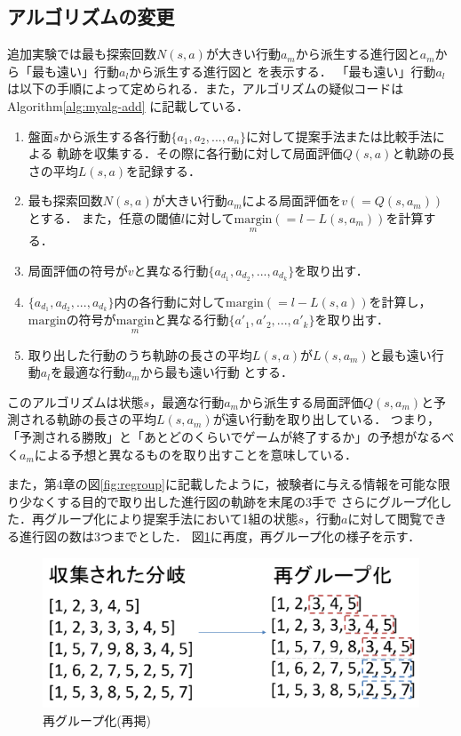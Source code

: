 \subsection{アルゴリズムの変更}
追加実験では最も探索回数$N(s, a)$が大きい行動$a_m$から派生する進行図と$a_m$から「最も遠い」行動$a_l$から派生する進行図と
を表示する．
「最も遠い」行動$a_l$は以下の手順によって定められる．また，アルゴリズムの疑似コードはAlgorithm\ref{alg:myalg-add} に記載している．
\begin{enumerate}
    \item 盤面$s$から派生する各行動$\{a_1, a_2, ..., a_n\}$に対して提案手法または比較手法による
    軌跡を収集する．その際に各行動に対して局面評価$Q(s, a)$と軌跡の長さの平均$L(s, a)$を記録する．
    \item 最も探索回数$N(s, a)$が大きい行動$a_m$による局面評価を$v(=Q(s, a_m))$とする．
    また，任意の閾値$l$に対して$\underset{m}{\textrm{margin}}(=l-L(s, a_m))$を計算する．
    \item 局面評価の符号が$v$と異なる行動$\{a_{d_1}, a_{d_2}, ..., a_{d_k}\}$を取り出す．
    \item $\{a_{d_1}, a_{d_2}, ..., a_{d_k}\}$内の各行動に対して$\textrm{margin}(=l-L(s, a))$を計算し，
    $\textrm{margin}$の符号が$\underset{m}{\textrm{margin}}$と異なる行動$\{{a'}_{1}, {a'}_{2}, ..., {a'}_{k}\}$を取り出す．
    \item 取り出した行動のうち軌跡の長さの平均$L(s, a)$が$L(s, a_m)$と最も遠い行動$a_l$を最適な行動$a_m$から最も遠い行動
    とする．
\end{enumerate}
このアルゴリズムは状態$s$，最適な行動$a_m$から派生する局面評価$Q(s, a_m)$と予測される軌跡の長さの平均$L(s, a_m)$が遠い行動を取り出している．
つまり，「予測される勝敗」と「あとどのくらいでゲームが終了するか」の予想がなるべく$a_m$による予想と異なるものを取り出すことを意味している．

また，第4章の図\ref{fig:regroup}に記載したように，被験者に与える情報を可能な限り少なくする目的で取り出した進行図の軌跡を末尾の3手で
さらにグループ化した．再グループ化により提案手法において1組の状態$s$，行動$a$に対して閲覧できる進行図の数は3つまでとした．
図\ref{fig:re-regroup}に再度，再グループ化の様子を示す．
\begin{figure}[htbp]
	\centering
	\includegraphics[width=\linewidth]{./figure/regroup.pdf}
	\caption{再グループ化(再掲)}
	\label{fig:re-regroup}
\end{figure}

